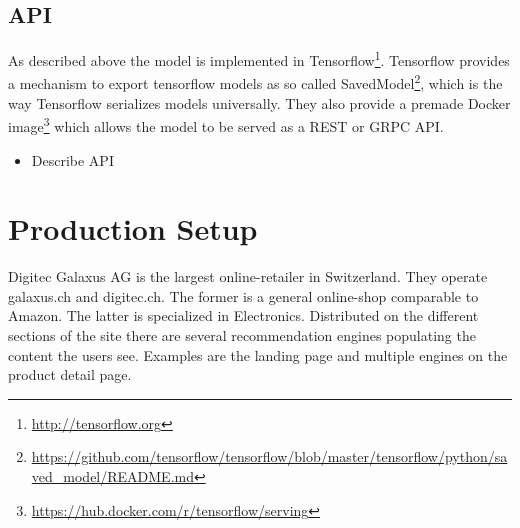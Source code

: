 \subsection{API}\label{api}
As described above the model is implemented in Tensorflow\footnote{\url{http://tensorflow.org}}.
Tensorflow provides a mechanism to export tensorflow models as so called SavedModel\footnote{\url{https://github.com/tensorflow/tensorflow/blob/master/tensorflow/python/saved_model/README.md}}, which is the way Tensorflow serializes models universally.
They also provide a premade Docker image\footnote{\url{https://hub.docker.com/r/tensorflow/serving}} which allows the model to be served as a REST or GRPC API.
\begin{itemize}
\item Describe API
\end{itemize}

\section{Production Setup}
Digitec Galaxus AG is the largest online-retailer in Switzerland.
They operate galaxus.ch and digitec.ch. The former is a general online-shop comparable to Amazon. 
The latter is specialized in Electronics.
Distributed on the different sections of the site there are several recommendation engines populating the content the users see.
Examples are the landing page and multiple engines on the product detail page.

